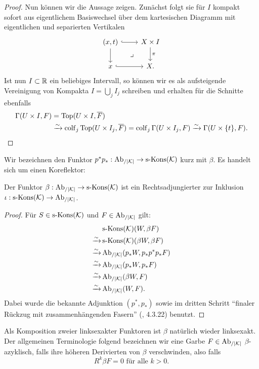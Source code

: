 \begin{proof}
  Nun können wir die Aussage zeigen. Zunächst folgt sie für $I$
  kompakt sofort aus eigentlichem Basiswechsel über dem kartesischen
  Diagramm mit eigentlichen und separierten Vertikalen
  \[ \begin{tikzcd}
    (x, t) \arrow[r, hook] \arrow[d] \arrow[dr, phantom, "\lrcorner"]
    & X \times I \arrow[d, "\pi"] \\
    x \arrow[r, hook]
    & X.
  \end{tikzcd} \]
  Ist nun $I \subset \mathbb{R}$ ein beliebiges Intervall, so können wir es
  als aufsteigende Vereinigung von Kompakta $I = \bigcup_j I_j$
  schreiben und erhalten für die Schnitte ebenfalls
  \begin{align*}
    \Gamma(U \times I, F)
     &= \operatorname{Top}(U \times I, \overline{F}) \\
     &\xrightarrow[]{\sim} \operatorname{colf}\limits_j \operatorname{Top}(U \times I_j, \overline{F})
     = \operatorname{colf}\limits_j \Gamma(U \times I_j, F)
     \xrightarrow[]{\sim} \Gamma(U \times \{t\}, F).
  \end{align*}
\end{proof}

Wir bezeichnen den Funktor $p^*p_*: \operatorname{Ab}_{/|\mathcal{K}|} \to \operatorname{s-Kons}(\mathcal{K})$ kurz mit
$\beta$. Es handelt sich um einen Koreflektor:
\begin{lemma} \label{beta-adjoint}
  Der Funktor $\beta: \operatorname{Ab}_{/|\mathcal{K}|} \to \operatorname{s-Kons}(\mathcal{K})$ ist ein Rechtsadjungierter
  zur Inklusion $\iota: \operatorname{s-Kons}(\mathcal{K}) \to \operatorname{Ab}_{/|\mathcal{K}|}$.
\end{lemma}
\begin{proof}
  Für $S \in \operatorname{s-Kons}(\mathcal{K})$ und $F \in \operatorname{Ab}_{/|\mathcal{K}|}$ gilt:
  \begin{align*}
    & \operatorname{s-Kons}(\mathcal{K})(W, \beta F) \\
    \xrightarrow[]{\sim} & \operatorname{s-Kons}(\mathcal{K})(\beta W, \beta F) \\
    \xrightarrow[]{\sim} & \operatorname{Ab}_{/|\mathcal{K}|}(p_* W, p_* p^* p_* F) \\
    \xrightarrow[]{\sim} & \operatorname{Ab}_{/|\mathcal{K}|}(p_* W, p_* F) \\
    \xrightarrow[]{\sim} & \operatorname{Ab}_{/|\mathcal{K}|}(\beta W, F) \\
    \xrightarrow[]{\sim} & \operatorname{Ab}_{/|\mathcal{K}|}(W, F).
  \end{align*}
  Dabei wurde die bekannte Adjunktion $(p^*, p_*)$ sowie im dritten
  Schritt ``finaler Rückzug mit zusammenhängenden Fasern'' (\cite{TG},
  4.3.22) benutzt.
\end{proof}

Als Komposition zweier linksexakter Funktoren ist $\beta$ natürlich
wieder linksexakt. Der allgemeinen Terminologie folgend bezeichnen wir
eine Garbe $F \in \operatorname{Ab}_{/|\mathcal{K}|}$ $\beta$-azyklisch, falls ihre höheren
Derivierten von $\beta$ verschwinden, also falls
\[ R^k\beta F = 0 \text{ für alle } k > 0.  \]

